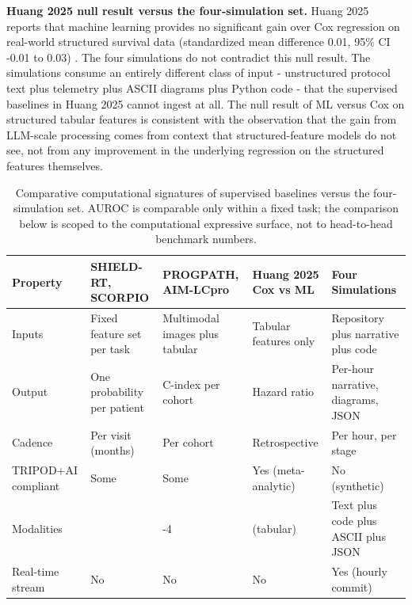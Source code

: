 \textbf{Huang 2025 null result versus the four-simulation set.}
Huang 2025 reports that machine learning provides no significant gain
over Cox regression on real-world structured survival data
(standardized mean difference 0.01, 95\% CI -0.01 to 0.03)
\cite{Huang2025CancerSurvivalMetaAnalysis}. The four simulations do
not contradict this null result. The simulations consume an entirely
different class of input - unstructured protocol text plus telemetry
plus ASCII diagrams plus Python code - that the supervised baselines
in Huang 2025 cannot ingest at all. The null result of ML versus Cox
on structured tabular features is consistent with the observation
that the gain from LLM-scale processing comes from context that
structured-feature models do not see, not from any improvement in the
underlying regression on the structured features themselves.

\begin{table}[H]
\centering
\caption{Comparative computational signatures of supervised baselines
versus the four-simulation set. AUROC is comparable only within a
fixed task; the comparison below is scoped to the computational
expressive surface, not to head-to-head benchmark numbers.}
\label{tab:disc-baseline-vs-sim}
{\renewcommand{\arraystretch}{1.15}
\begin{tabular}{>{\raggedright\arraybackslash}p{2.6cm} >{\raggedright\arraybackslash}p{3cm} >{\raggedright\arraybackslash}p{3cm} >{\raggedright\arraybackslash}p{3cm} >{\raggedright\arraybackslash}p{3cm}}
\toprule
\textbf{Property} & \textbf{SHIELD-RT, SCORPIO} & \textbf{PROGPATH, AIM-LCpro} & \textbf{Huang 2025 Cox vs ML} & \textbf{Four Simulations} \\
\midrule
Inputs              & Fixed feature set per task    & Multimodal images plus tabular  & Tabular features only         & Repository plus narrative plus code        \\
Output              & One probability per patient   & C-index per cohort              & Hazard ratio                  & Per-hour narrative, diagrams, JSON \\
Cadence             & Per visit (months)            & Per cohort                      & Retrospective                 & Per hour, per stage                      \\
TRIPOD+AI compliant & Some                          & Some                            & Yes (meta-analytic)           & No (synthetic)                             \\
Modalities          & 1                             & 2-4                             & 1 (tabular)                   & Text plus code plus ASCII plus JSON         \\
Real-time stream    & No                            & No                              & No                            & Yes (hourly commit)                        \\
\bottomrule
\end{tabular}}
\end{table}

